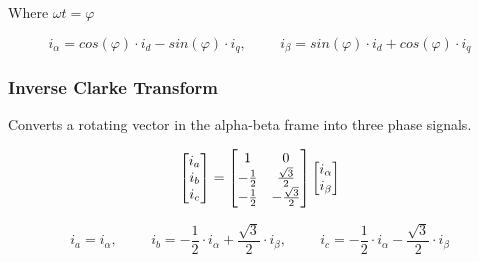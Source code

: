 Where
$\omega t = \varphi$

\begin{equation}
    i_{\alpha} = cos(\varphi) \cdot i_{d} - sin(\varphi) \cdot i_{q}
    , \hspace{1cm}
    i_{\beta} = sin(\varphi) \cdot i_{d} + cos(\varphi) \cdot i_{q}
    \label{eq:inverse_park_transformation}
\end{equation}

\subsubsection{Inverse Clarke Transform}
Converts a rotating vector in the alpha-beta frame into three phase signals. 

\begin{equation}
    \centering
    \begin{bmatrix}
        i_{a} \\ 
        i_{b} \\ 
        i_{c}
    \end{bmatrix}
    =
    \begin{bmatrix}
        1 & 0 \\
        - \frac{1}{2} & \frac{\sqrt{3}}{2} \\
        - \frac{1}{2} & - \frac{\sqrt{3}}{2}
    \end{bmatrix}
    \begin{bmatrix}
        i_{\alpha} \\ 
        i_{\beta}
    \end{bmatrix}
\end{equation}


\begin{equation}
    i_{a} = i_{\alpha}
    , \hspace{1cm}
    i_{b} = -\frac{1}{2} \cdot i_{\alpha} + \frac{\sqrt{3}}{2} \cdot i_{\beta}
    , \hspace{1cm}
    i_{c} = -\frac{1}{2} \cdot i_{\alpha} - \frac{\sqrt{3}}{2} \cdot i_{\beta}
    \label{eq:inverse_clarke_transformation}
\end{equation}